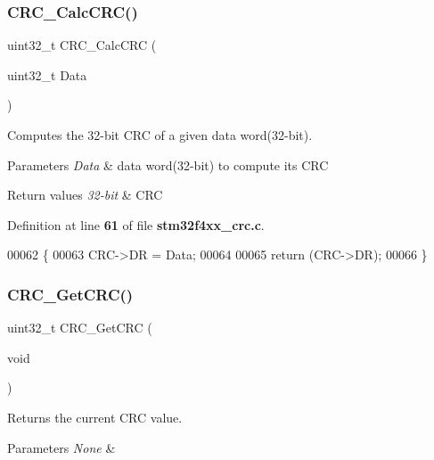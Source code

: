 \subsubsection{C\+R\+C\+\_\+\+Calc\+C\+R\+C()}
{\footnotesize\ttfamily uint32\+\_\+t C\+R\+C\+\_\+\+Calc\+C\+RC (\begin{DoxyParamCaption}\item[{uint32\+\_\+t}]{Data }\end{DoxyParamCaption})}



Computes the 32-\/bit C\+RC of a given data word(32-\/bit). 


\begin{DoxyParams}{Parameters}
{\em Data} & data word(32-\/bit) to compute its C\+RC \\
\hline
\end{DoxyParams}

\begin{DoxyRetVals}{Return values}
{\em 32-\/bit} & C\+RC \\
\hline
\end{DoxyRetVals}


Definition at line \textbf{ 61} of file \textbf{ stm32f4xx\+\_\+crc.\+c}.


\begin{DoxyCode}
00062 \{
00063   CRC->DR = Data;
00064   
00065   \textcolor{keywordflow}{return} (CRC->DR);
00066 \}
\end{DoxyCode}
\mbox{\label{group__CRC__Private__Functions_gab62db4561b0558f3c8ed53887fe7de8b}} 
\subsubsection{C\+R\+C\+\_\+\+Get\+C\+R\+C()}
{\footnotesize\ttfamily uint32\+\_\+t C\+R\+C\+\_\+\+Get\+C\+RC (\begin{DoxyParamCaption}\item[{void}]{ }\end{DoxyParamCaption})}



Returns the current C\+RC value. 


\begin{DoxyParams}{Parameters}
{\em None} & \\
\hline
\end{DoxyParams}

